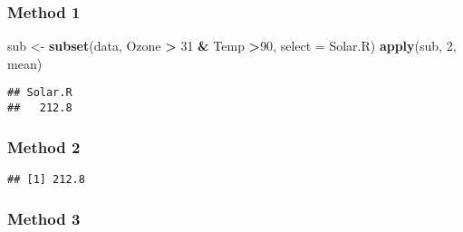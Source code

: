 \documentclass[]{article}
\newenvironment{Shaded}{\begin{snugshade}}{\end{snugshade}}
\newcommand{\DataTypeTok}[1]{\textcolor[rgb]{0.13,0.29,0.53}{#1}}
\newcommand{\DecValTok}[1]{\textcolor[rgb]{0.00,0.00,0.81}{#1}}
\newcommand{\KeywordTok}[1]{\textcolor[rgb]{0.13,0.29,0.53}{\textbf{#1}}}
\newcommand{\NormalTok}[1]{#1}
\newcommand{\OperatorTok}[1]{\textcolor[rgb]{0.81,0.36,0.00}{\textbf{#1}}}
\newcommand{\StringTok}[1]{\textcolor[rgb]{0.31,0.60,0.02}{#1}}
\begin{document}
\hypertarget{method-1-3}{%
\subsubsection{Method 1}\label{method-1-3}}

\begin{Shaded}
\begin{Highlighting}[]
\NormalTok{sub <-}\StringTok{ }\KeywordTok{subset}\NormalTok{(data, Ozone }\OperatorTok{>}\StringTok{ }\DecValTok{31} \OperatorTok{&}\StringTok{ }\NormalTok{Temp }\OperatorTok{>}\DecValTok{90}\NormalTok{, }\DataTypeTok{select =}\NormalTok{ Solar.R)}
\KeywordTok{apply}\NormalTok{(sub, }\DecValTok{2}\NormalTok{, mean)}
\end{Highlighting}
\end{Shaded}

\begin{verbatim}
## Solar.R 
##   212.8
\end{verbatim}

\hypertarget{method-2-4}{%
\subsubsection{Method 2}\label{method-2-4}}

\begin{Shaded}
\end{Shaded}

\begin{verbatim}
## [1] 212.8
\end{verbatim}

\hypertarget{method-3-3}{%
\subsubsection{Method 3}\label{method-3-3}}

\begin{Shaded}
\end{Shaded}
\end{document}
